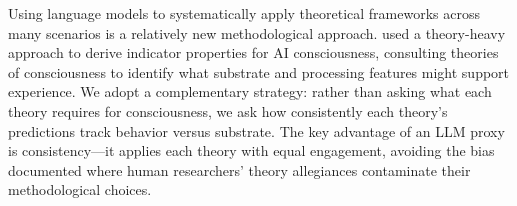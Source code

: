 Using language models to systematically apply theoretical frameworks across many scenarios is a relatively new methodological approach.
\citet{butlin2023consciousness} used a theory-heavy approach to derive indicator properties for AI consciousness, consulting theories of consciousness to identify what substrate and processing features might support experience.
We adopt a complementary strategy: rather than asking what each theory requires for consciousness, we ask how consistently each theory's predictions track behavior versus substrate.
The key advantage of an LLM proxy is consistency---it applies each theory with equal engagement, avoiding the bias \citet{yaron2022contrast} documented where human researchers' theory allegiances contaminate their methodological choices.
